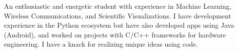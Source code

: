 %
%
%
\par{
An enthusiastic and energetic student with experience in Machine Learning, Wireless Communications, and Scientific Visualizations. I have development experience in the Python ecosystem but have also developed apps using Java (Android), and worked on projects with C/C++ frameworks for hardware engineering. I have a knack for realizing unique ideas using code.}